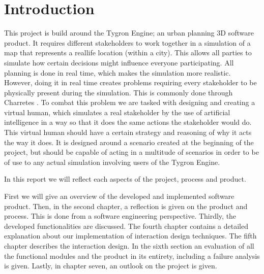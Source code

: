 \section{Introduction}

This project is build around the Tygron Engine; an urban planning 3D software product. It requires different stakeholders to work together in a simulation of a map that represents a reallife location (within a city). This allows all parties to simulate how certain decisions might influence everyone participating. All planning is done in real time, which makes the simulation more realistic. However, doing it in real time creates problems requiring every stakeholder to be physically present during the simulation. This is commonly done through Charretes \cite{Todd13}. To combat this problem we are tasked with designing and creating a virtual human, which simulates a real stakeholder by the use of artificial intelligence in a way so that it does the same actions the stakeholder would do. This virtual human should have a certain strategy and reasoning of why it acts the way it does. It is designed around a scenario created at the beginning of the project, but should be capable of acting in a multitude of scenarios in order to be of use to any actual simulation involving users of the Tygron Engine.

In this report we will reflect each aspects of the project, process and product.

First we will give an overview of the developed and implemented software product. Then, in the second chapter, a reflection is given on the product and process. This is done from a software engineering perspective. Thirdly, the developed functionalities are discussed. The fourth chapter contains a detailed explanation about our implementation of interaction design techniques. The fifth chapter describes the interaction design. In the sixth section an evaluation of all the functional modules and the product in its entirety, including a failure analysis is given. Lastly, in chapter seven, an outlook on the project is given.

